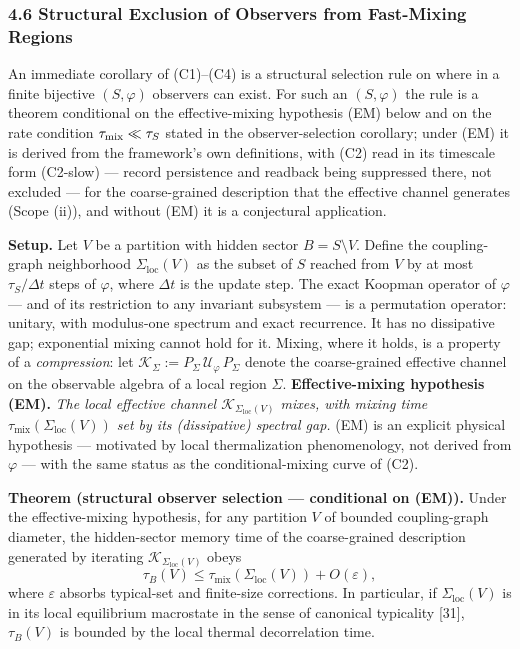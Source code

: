 \documentclass[
]{article}
\begin{document}
\hypertarget{structural-exclusion-of-observers-from-fast-mixing-regions}{%
\subsubsection{4.6 Structural Exclusion of Observers from Fast-Mixing
Regions}\label{structural-exclusion-of-observers-from-fast-mixing-regions}}

An immediate corollary of (C1)--(C4) is a structural selection rule on
where in a finite bijective \((S, \varphi)\) observers can exist. For
such an \((S,\varphi)\) the rule is a theorem conditional on the
effective-mixing hypothesis (EM) below and on the rate condition
\(\tau_{\rm mix}\ll\tau_S\) stated in the observer-selection corollary;
under (EM) it is derived from the framework's own definitions, with (C2)
read in its timescale form (C2-slow) --- record persistence and readback
being suppressed there, not excluded --- for the coarse-grained
description that the effective channel generates (Scope (ii)), and
without (EM) it is a conjectural application.

\textbf{Setup.} Let \(V\) be a partition with hidden sector
\(B = S \setminus V\). Define the coupling-graph neighborhood
\(\Sigma_{\text{loc}}(V)\) as the subset of \(S\) reached from \(V\) by
at most \(\tau_S / \Delta t\) steps of \(\varphi\), where \(\Delta t\)
is the update step. The exact Koopman operator of \(\varphi\) --- and of
its restriction to any invariant subsystem --- is a permutation
operator: unitary, with modulus-one spectrum and exact recurrence. It
has no dissipative gap; exponential mixing cannot hold for it. Mixing,
where it holds, is a property of a \emph{compression}: let
\(\mathcal{K}_\Sigma := P_\Sigma\, \mathcal{U}_\varphi\, P_\Sigma\)
denote the coarse-grained effective channel on the observable algebra of
a local region \(\Sigma\). \textbf{Effective-mixing hypothesis (EM).}
\emph{The local effective channel
\(\mathcal{K}_{\Sigma_{\text{loc}}(V)}\) mixes, with mixing time
\(\tau_{\text{mix}}(\Sigma_{\text{loc}}(V))\) set by its (dissipative)
spectral gap.} (EM) is an explicit physical hypothesis --- motivated by
local thermalization phenomenology, not derived from \(\varphi\) ---
with the same status as the conditional-mixing curve of (C2).

\textbf{Theorem (structural observer selection --- conditional on
(EM)).} Under the effective-mixing hypothesis, for any partition \(V\)
of bounded coupling-graph diameter, the hidden-sector memory time of the
coarse-grained description generated by iterating
\(\mathcal{K}_{\Sigma_{\text{loc}}(V)}\) obeys \[
\tau_B(V) \leq \tau_{\text{mix}}(\Sigma_{\text{loc}}(V)) + O(\varepsilon),
\] where \(\varepsilon\) absorbs typical-set and finite-size
corrections. In particular, if \(\Sigma_{\text{loc}}(V)\) is in its
local equilibrium macrostate in the sense of canonical typicality
{[}31{]}, \(\tau_B(V)\) is bounded by the local thermal decorrelation
time.
\end{document}
